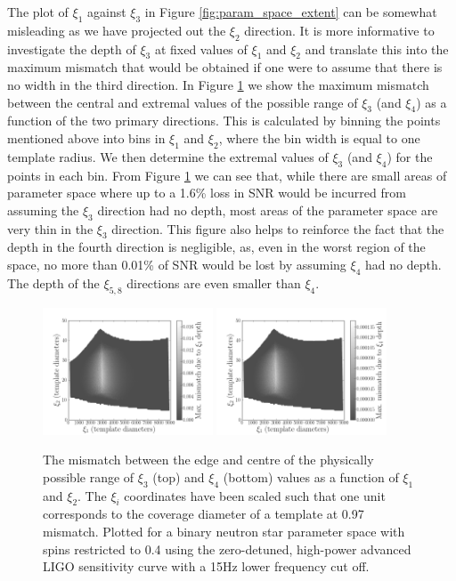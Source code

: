 The plot of $\xi_1$ against $\xi_3$ in Figure \ref{fig:param_space_extent} can be somewhat misleading
as we have projected out the $\xi_2$ direction.
It is more informative to investigate the depth of $\xi_3$ at fixed values of $\xi_1$ and $\xi_2$
and translate this into the maximum mismatch that would be obtained
if one were to assume that there is no width in the third direction.
In Figure \ref{fig:param_space_mismatch} we show the maximum
mismatch between the central and extremal values of the possible range of
$\xi_3$ (and $\xi_4$) as a function of the
two primary directions. This is calculated by binning the points mentioned above into bins in
$\xi_1$ and $\xi_2$, where the bin width is equal to one template radius. We then determine the extremal values of
$\xi_3$ (and $\xi_4$) for the points in each bin. From Figure \ref{fig:param_space_mismatch}
we can see that, while there are small areas
of parameter space where up to a 1.6\% loss in SNR would be incurred from assuming the $\xi_3$
direction had no depth,
most areas of the parameter space are very thin in the $\xi_3$ direction. This figure also helps to reinforce
the fact that the depth in the fourth direction is negligible, as, even in the worst region of the space, no more
than 0.01\% of SNR would be lost by assuming $\xi_4$ had no depth. The depth of the $\xi_{5,8}$ directions
are even smaller than $\xi_4$.

\begin{figure}
\includegraphics[width=0.45\textwidth]{papers/bns_spin/figure3a.png}
\includegraphics[width=0.45\textwidth]{papers/bns_spin/figure3b.png}
\caption{\label{fig:param_space_mismatch} The mismatch between the edge and centre of the
physically possible range of $\xi_3$ (top) and $\xi_4$ (bottom) values as a function of
$\xi_1$ and $\xi_2$. The $\xi_i$ coordinates have been scaled
such that one unit corresponds to the coverage diameter of a template
at 0.97 mismatch. Plotted for a binary neutron star parameter space with spins restricted
to 0.4 using the zero-detuned, high-power advanced LIGO sensitivity curve with a 15Hz lower frequency cut off.}
\end{figure}

